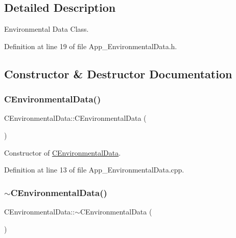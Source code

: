 \subsection{Detailed Description}
Environmental Data Class. 

Definition at line 19 of file App\+\_\+\+Environmental\+Data.\+h.



\subsection{Constructor \& Destructor Documentation}
\mbox{\label{class_c_environmental_data_a93b5c52fc18b109c6f1de9d3a5007033}} 
\subsubsection{\texorpdfstring{CEnvironmentalData()}{CEnvironmentalData()}}
{\footnotesize\ttfamily C\+Environmental\+Data\+::\+C\+Environmental\+Data (\begin{DoxyParamCaption}{ }\end{DoxyParamCaption})}



Constructor of \mbox{\hyperlink{class_c_environmental_data}{C\+Environmental\+Data}}. 



Definition at line 13 of file App\+\_\+\+Environmental\+Data.\+cpp.

\mbox{\label{class_c_environmental_data_a9ec6952d01bbc0b5813889237535b71d}} 
\subsubsection{\texorpdfstring{$\sim$CEnvironmentalData()}{~CEnvironmentalData()}}
{\footnotesize\ttfamily C\+Environmental\+Data\+::$\sim$\+C\+Environmental\+Data (\begin{DoxyParamCaption}{ }\end{DoxyParamCaption})}



